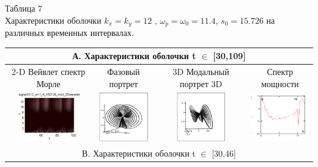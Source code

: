 \documentclass[12pt,letterpaper]{extreport}
\begin{document}
\begin{table}[H]

{\setlength{\arrayrulewidth}{1.25pt}
\begin{flushright}
Таблица 7\\
Характеристики оболочки $k_x=k_y=12$ , $\omega_p= 
\omega_0 =11.4$, $s_0=15.726$  на различных временных 
интервалах.

\end{flushright}
\begin{tabular}{|c|c|c|c|}

\hline
\multicolumn{4}{|c|}{А. Характеристики оболочки t $\in$ 
[30,109]}

\\
\hline
\footnotesize 2-D Вейвлет спектр Морле&\footnotesize 
Фазовый портрет&\footnotesize 3D	Модальный портрет 
3D&\footnotesize Спектр мощности\\
\hline
	\includegraphics[height = 80px]{a1} 	
	&	
	\includegraphics[height = 80px]{a2} 	
	&	
	\includegraphics[height = 80px]{a3} 
	&
	\includegraphics[height = 80px]{a4} 
\\
\hline
\multicolumn{4}{|c|}{В. Характеристики оболочки t $\in$ 
[30,46]}\\


\end{tabular}}
\end{table}
\end{document}
